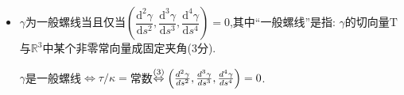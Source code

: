\begin{itemize}
\begin{itemize}
\begin{proofc}
\begin{align*}
                &=\kappa^{3}\Bigl( 2\frac{d\kappa}{ds}\tau+\kappa\frac{d\tau}{ds} \Bigr)-3\kappa^{3}\tau\frac{d\kappa}{ds}\\
                &=\kappa^{3}\Bigl( \kappa\frac{d\tau}{ds}-\frac{d\kappa}{ds}\tau \Bigr)\\
                &=\kappa^{5}\frac{d}{ds}\Bigl( \frac{\tau}{\kappa} \Bigr).
            \end{align*}
        \end{proofc}
        \item[(4)]$\gamma$为一般螺线当且仅当$\left( \dfrac{\mathrm{d}^2\gamma}{\mathrm{d}s^2},\dfrac{\mathrm{d}^3\gamma}{\mathrm{d}s^3}, \dfrac{\mathrm{d}^4\gamma}{\mathrm{d}s^4}\right)=0$,其中“一般螺线”是指: $\gamma$的切向量$\mathrm{T}$与$\mathbb{R}^{3}$中某个非零常向量成固定夹角(3分).
        \begin{proofc}
            $\gamma$是一般螺线$\Leftrightarrow\tau/\kappa=$常数$\overset{(3)}{\Leftrightarrow}\Bigl( \frac{d^{2}\gamma}{ds^{2}},\frac{d^{3}\gamma}{ds^{3}},\frac{d^{4}\gamma}{ds^{4}} \Bigr)=0$.    
        \end{proofc}    
    \end{itemize}


\end{itemize}
